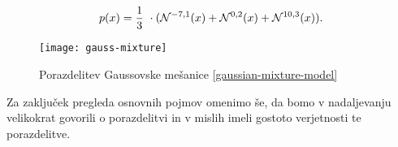 \begin{zgled}
\begin{enumerate}
{		\begin{equation}\label{gaussian-mixture-model}
			p(x) = \frac{1}{3} \cdot (\N^{-7,1}(x) + \N^{0,2}(x) + \N^{10,3}(x)).
		\end{equation}
		\begin{figure}[!ht]
			\centering
			\texttt{[image: gauss-mixture]}
			\caption{Porazdelitev Gaussovske mešanice \eqref{gaussian-mixture-model}}
		\end{figure}
	}
\end{enumerate}
\end{zgled}
	

Za zaključek pregleda osnovnih pojmov omenimo še, da bomo v nadaljevanju velikokrat govorili o porazdelitvi in v mislih imeli gostoto verjetnosti te porazdelitve.